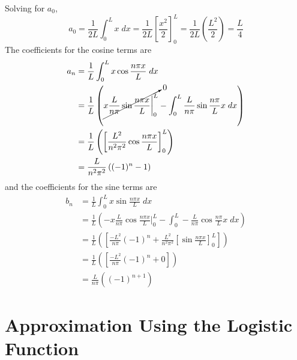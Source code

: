 Solving for \(a_0\), 
%
\begin{equation}
 a_0 = \frac{1}{2 L } \int_{0}^{L} x \; dx = \frac{1}{2 L} \left[ \frac{x^2}{2} \right]^{L}_{0} = \frac{1}{2 L} \left(\frac{L^2}{2} \right) = \frac{L}{4}
\end{equation}
%
The coefficients for the cosine terms are 
%
\begin{equation}
 \begin{split} 
     a_n &= \frac{1}{L} \int_{0}^{L} x \cos{\frac{n \pi x}{L}} \; dx \\ 
         &=  \frac{1}{L} \left(\cancelto{0}{x \frac{L}{n \pi}   \sin{\frac{n \pi x}{L}}  \bigg|^{L}_0}  - \int_0^L \frac{L}{n \pi} \sin{\frac{n \pi}{L} x} \; dx  \right) \\
         &= \frac{1}{L} \left( \left[ \frac{L^2}{n^2 \pi^2} \cos{\frac{n \pi x}{L}}  \right]^L_0 \right) \\
         &= \frac{L}{n^2 \pi^2}\left( (-1)^n - 1 \right)
 \end{split}
\end{equation}
%
%
and the coefficients for the sine terms are 
%
%
\begin{equation}
 \begin{split} 
     b_n &= \frac{1}{L} \int_{0}^{L} x \sin{\frac{n \pi x}{L}} \; dx \\ 
         &=  \frac{1}{L} \left(-x \frac{L}{n \pi}   \cos{\frac{n \pi x}{L}}  \bigg|^{L}_0  - \int_0^L -\frac{L}{n \pi}\cos{\frac{n \pi}{L} x} \; dx  \right) \\
         &= \frac{1}{L} \left( \left[ \frac{-L^2}{n \pi} (-1)^n  +\frac{L^2}{n^2 \pi^2}   \left[ \sin{\frac{n \pi x}{L}} \right]_0^L  \right] \right) \\
         &= \frac{1}{L} \left( \left[ \frac{-L^2}{n \pi} (-1)^n  + 0 \right] \right) \\
         &= \frac{L}{n \pi}\left( (-1)^{n+1} \right)
 \end{split}
\end{equation}

\section{Approximation Using the Logistic Function}

